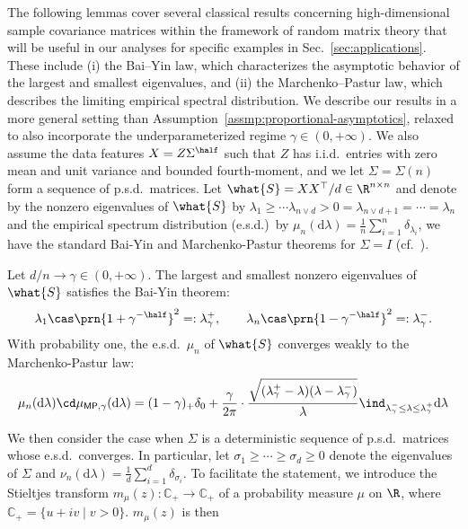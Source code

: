 \documentclass[11pt]{article}
\newcommand{\de}{\mathrm{d}}
\begin{document}
The following lemmas cover several classical results concerning high-dimensional sample covariance matrices within the framework of random matrix theory that will be useful in our analyses for specific examples in Sec.~\ref{sec:applications}. These include (i) the Bai–Yin law, which characterizes the asymptotic behavior of the largest and smallest eigenvalues, and (ii) the Marchenko–Pastur law, which describes the limiting empirical spectral distribution. We describe our results in a more general setting than Assumption~\ref{assmp:proportional-asymptotics}, relaxed to also incorporate the underparameterized regime $\gamma \in (0, +\infty)$. We also assume the data features $X=Z\Sigma^{\half}$ such that $Z$ has i.i.d.\ entries with zero mean and unit variance and bounded fourth-moment, and we let $\Sigma= \Sigma(n)$ form a sequence of p.s.d.\ matrices. Let $\what{S}=XX^\top / d \in \R^{n \times n}$ and denote by the nonzero eigenvalues of $\what{S}$ by $\lambda_1 \geq \cdots \lambda_{n \vee d} > 0 = \lambda_{n \vee d + 1} = \cdots = \lambda_n$ and the empirical spectrum distribution (e.s.d.)\ by $\mu_n(\de \lambda) = \frac{1}{n} \sum_{i=1}^n \delta_{\lambda_i}$, we have the standard Bai-Yin and Marchenko-Pastur theorems for $\Sigma = I$ (cf.~\cite[Thm.~3.6 and Thm.~5.10]{bai2010spectral}).
\begin{lemma} \label{lem:MP-BY-law}
    Let $d/n \to \gamma \in (0, +\infty)$. The largest and smallest nonzero eigenvalues of $\what{S}$ satisfies the Bai-Yin theorem:
    \begin{align*}
        \lambda_1 \cas  \prn{1 + \gamma^{-\half}}^2  =: \lambda^+_\gamma, \qquad \lambda_n \cas  \prn{1 - \gamma^{-\half}}^2 =:\lambda^-_\gamma.
    \end{align*}
    With probability one, the e.s.d.\ $\mu_n$ of $\what{S}$ converges weakly to the Marchenko-Pastur law:
    \begin{align*}
        \mu_n(\de \lambda) \cd \mu_{\mathsf{MP}, \gamma}(\de \lambda) = (1 - \gamma)_+ \delta_0 + \frac{\gamma}{2\pi} \cdot \frac{\sqrt{(\lambda^+_\gamma-\lambda)(\lambda - \lambda^-_\gamma)}}{\lambda} \ind_{\lambda^-_\gamma \leq \lambda \leq \lambda^+_\gamma} \de \lambda 
    \end{align*}
\end{lemma}
We then consider the case when $\Sigma$ is a deterministic sequence of p.s.d.\ matrices whose e.s.d.\ converges. In particular, let $\sigma_1 \geq \cdots \geq \sigma_d \geq 0$ denote the eigenvalues of $\Sigma$ and $\nu_n(\de \lambda) = \frac{1}{d} \sum_{i=1}^d \delta_{\sigma_i}$. To facilitate the statement, we introduce the Stieltjes transform $m_{\mu}(z): \mathbb{C}_+ \to \mathbb{C}_+$ of a probability measure $\mu$ on $\R$, where $\mathbb{C}_+=\{u+iv \mid v>0\}$. $m_{\mu}(z)$ is then
\end{document}
